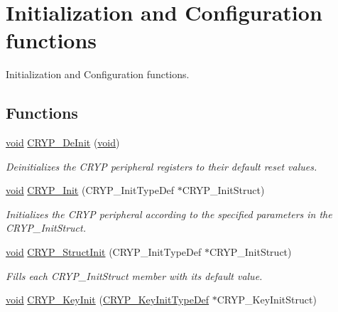 \hypertarget{group___c_r_y_p___group1}{\section{Initialization and Configuration functions}
\label{group___c_r_y_p___group1}
}


Initialization and Configuration functions.  


\subsection*{Functions}
\begin{DoxyCompactItemize}
\item 
\hyperlink{group___n_a_m_e_ga18028b8badbf1ea7e704ccac3c488e82}{void} \hyperlink{group___c_r_y_p___group1_gae19e54c9910b697e38f6c7577704ffae}{C\-R\-Y\-P\-\_\-\-De\-Init} (\hyperlink{group___n_a_m_e_ga18028b8badbf1ea7e704ccac3c488e82}{void})
\begin{DoxyCompactList}\small\item\em Deinitializes the C\-R\-Y\-P peripheral registers to their default reset values. \end{DoxyCompactList}\item 
\hyperlink{group___n_a_m_e_ga18028b8badbf1ea7e704ccac3c488e82}{void} \hyperlink{group___c_r_y_p___group1_ga7b72c458d95581ab0a36be3e017fcf02}{C\-R\-Y\-P\-\_\-\-Init} (C\-R\-Y\-P\-\_\-\-Init\-Type\-Def $\ast$C\-R\-Y\-P\-\_\-\-Init\-Struct)
\begin{DoxyCompactList}\small\item\em Initializes the C\-R\-Y\-P peripheral according to the specified parameters in the C\-R\-Y\-P\-\_\-\-Init\-Struct. \end{DoxyCompactList}\item 
\hyperlink{group___n_a_m_e_ga18028b8badbf1ea7e704ccac3c488e82}{void} \hyperlink{group___c_r_y_p___group1_ga8fb8ec75fe72d55046c8220825dfe41e}{C\-R\-Y\-P\-\_\-\-Struct\-Init} (C\-R\-Y\-P\-\_\-\-Init\-Type\-Def $\ast$C\-R\-Y\-P\-\_\-\-Init\-Struct)
\begin{DoxyCompactList}\small\item\em Fills each C\-R\-Y\-P\-\_\-\-Init\-Struct member with its default value. \end{DoxyCompactList}\item 
\hyperlink{group___n_a_m_e_ga18028b8badbf1ea7e704ccac3c488e82}{void} \hyperlink{group___c_r_y_p___group1_gad4baa3865415215cae07c9fbfa131cb9}{C\-R\-Y\-P\-\_\-\-Key\-Init} (\hyperlink{struct_c_r_y_p___key_init_type_def}{C\-R\-Y\-P\-\_\-\-Key\-Init\-Type\-Def} $\ast$C\-R\-Y\-P\-\_\-\-Key\-Init\-Struct)

\end{DoxyCompactItemize}
